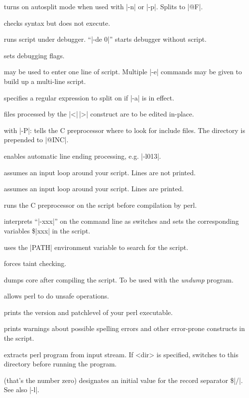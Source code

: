\begin{enum}{1cm}

 turns on autosplit mode when used with |-n| or
|-p|. Splits to |@F|.

 checks syntax but does not execute.

 runs script under debugger. ``|-de 0|''
starts debugger without script.

 sets debugging flags. 

 may be used to enter one line of
script. Multiple |-e| commands may be given to build up a
multi-line script.

 specifies a regular expression to split on 
if |-a| is in effect.\ddag

 files processed by the |<|\,|>| construct are
to be edited in-place.

 with |-P|: tells the C preprocessor where
to look for include files. The directory is prepended to |@INC|.

 enables automatic line ending processing, 
e.g. |-l013|.

 assumes an input loop around your script. Lines are not
printed.

 assumes an input loop around your script. Lines are
printed.

 runs the C preprocessor on the script before
compilation by perl.

 interprets ``|-xxx|'' on the command line as
switches and sets the corresponding variables \$|xxx| in the script.

 uses the |PATH| environment variable to search for
the script.

 forces taint checking.\ddag

 dumps core after compiling the script. To be used with
the {\it undump\/} program.

 allows perl to do unsafe operations.

 prints the version and patchlevel of your perl
executable.

 prints warnings about possible spelling errors and
other error-prone constructs in the script.

 extracts perl program from input stream.
If <dir> is specified, switches to this directory before running 
the program.

 (that's the number zero) designates an
initial value for the record separator \$|/|.
See also |-l|.

\end{enum}


